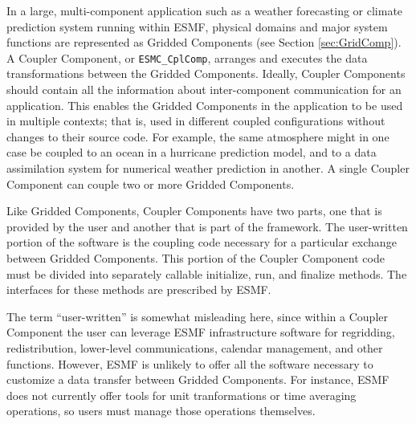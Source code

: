 %


\label{sec:CplComp}

In a large, multi-component application such as a weather 
forecasting or climate prediction system running within ESMF, 
physical domains and major system functions are represented 
as Gridded Components 
(see Section \ref{sec:GridComp}).  A Coupler Component, or 
{\tt ESMC\_CplComp}, arranges and executes the data 
transformations between the Gridded Components.  Ideally, 
Coupler Components should contain all the information 
about inter-component communication for an application.
This enables the Gridded Components in the application to be 
used in multiple contexts; that is, used in different coupled 
configurations without changes to their source code. 
For example, the same atmosphere might in one case be coupled 
to an ocean in a hurricane prediction model, and to a 
data assimilation system for numerical weather prediction in
another.  A single Coupler Component can couple 
two or more Gridded Components.

Like Gridded Components, Coupler Components have two parts, one
that is provided by the user and another that is part of the 
framework.  The user-written portion of the software is the coupling
code necessary for a particular exchange between Gridded Components.  
This portion of the Coupler Component code must be divided into 
separately callable initialize, run, and finalize methods.  The 
interfaces for these methods are prescribed by ESMF.

The term ``user-written'' is somewhat misleading here, since within 
a Coupler Component the user can leverage ESMF infrastructure 
software for regridding, redistribution, lower-level communications, 
calendar management, and other functions.  However, ESMF is unlikely 
to offer all the software necessary to customize a data transfer
between Gridded Components.  For instance, ESMF does not currently 
offer tools for unit tranformations or time averaging operations, 
so users must manage those operations themselves.

